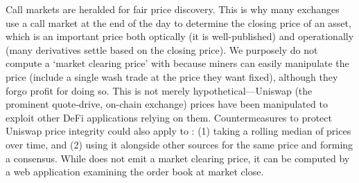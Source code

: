 
Call markets are heralded for fair price discovery. This is why many exchanges use a call market at the end of the day to determine the closing price of an asset, which is an important price both optically (it is well-published) and operationally (many derivatives settle based on the closing price). We purposely do not compute a `market clearing price' with \cm because miners can easily manipulate the price (\ie include a single wash trade at the price they want fixed), although they forgo profit for doing so. This is not merely hypothetical---Uniswap (the prominent quote-drive, on-chain exchange) prices have been manipulated to exploit other DeFi applications relying on them. Countermeasures to protect Uniswap price integrity could also apply to \cm: (1) taking a rolling median of prices over time, and (2) using it alongside other sources for the same price and forming a consensus. While \cm does not emit a market clearing price, it can be computed by a web application examining the order book at market close.